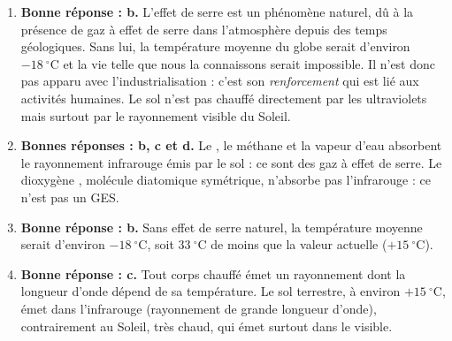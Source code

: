 \documentclass[11pt]{article}
\newcommand{\cle}[1]{{\popxbold\color{popdark}#1}}
\begin{document}
\begin{corrige}
\begin{enumerate}
\item \textbf{Bonne réponse : b.} L'effet de serre est un phénomène \cle{naturel}, dû à la présence de gaz à effet de serre dans l'atmosphère depuis des temps géologiques. Sans lui, la température moyenne du globe serait d'environ $-18\ ^\circ\mathrm{C}$ et la vie telle que nous la connaissons serait impossible. Il n'est donc pas apparu avec l'industrialisation : c'est son \emph{renforcement} qui est lié aux activités humaines. Le sol n'est pas chauffé directement par les ultraviolets mais surtout par le rayonnement visible du Soleil.
\item \textbf{Bonnes réponses : b, c et d.} Le , le méthane  et la vapeur d'eau  absorbent le rayonnement infrarouge émis par le sol : ce sont des gaz à effet de serre. Le dioxygène , molécule diatomique symétrique, n'absorbe pas l'infrarouge : ce n'est pas un GES.
\item \textbf{Bonne réponse : b.} Sans effet de serre naturel, la température moyenne serait d'environ $-18\ ^\circ\mathrm{C}$, soit $33\ ^\circ\mathrm{C}$ de moins que la valeur actuelle ($+15\ ^\circ\mathrm{C}$).
\item \textbf{Bonne réponse : c.} Tout corps chauffé émet un rayonnement dont la longueur d'onde dépend de sa température. Le sol terrestre, à environ $+15\ ^\circ\mathrm{C}$, émet dans l'\cle{infrarouge} (rayonnement de grande longueur d'onde), contrairement au Soleil, très chaud, qui émet surtout dans le visible.
\end{enumerate}
\end{corrige}
\end{document}
